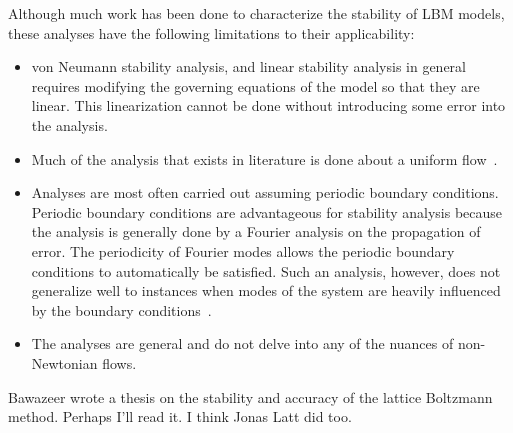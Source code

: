 \documentclass{article}
\begin{document}
Although much work has been done to characterize the stability of LBM models, these analyses have the following limitations to their applicability:
\begin{itemize}
	\item von Neumann stability analysis, and linear stability analysis in general requires modifying the governing equations of the model so that they are linear. %
	This linearization cannot be done without introducing some error into the analysis.
	\item Much of the analysis that exists in literature is done about a uniform flow~\cite{worthing1997stability,niu2004investigation}. %
	\item Analyses are most often carried out assuming periodic boundary conditions.
	Periodic boundary conditions are advantageous for stability analysis because the analysis is generally done by a Fourier analysis on the propagation of error.
	The periodicity of Fourier modes allows the periodic boundary conditions to automatically be satisfied.
	Such an analysis, however, does not generalize well to instances when modes of the system are heavily influenced by the boundary conditions~\cite{worthing1997stability}. %
	\item The analyses are general and do not delve into any of the nuances of non-Newtonian flows.
\end{itemize}
{\color{red} Bawazeer wrote a thesis on the stability and accuracy of the lattice Boltzmann method. Perhaps I'll read it. I think Jonas Latt did too.}
\end{document}
